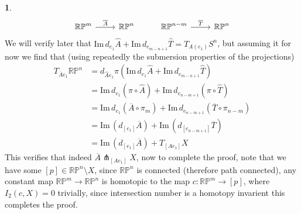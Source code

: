 \documentclass[10.5pt]{article}
\theoremstyle{definition}
\newtheorem{pb}{}
\begin{document}
\begin{pb}
\begin{equation*}
\begin{tikzcd}
            \mathbb{RP}^m \arrow[r,"{\overline{A}}"] &\mathbb{RP}^n &\mathbb{RP}^{n-m} \arrow[r,"\overline{T}"] &\mathbb{RP}^n
            \end{tikzcd}
        \end{equation*}
        We will verify later that \(\text{Im}\,d_{e_1}\widehat{A} + \text{Im}\,d_{e_{m-n+1}}\widehat{T} = T_{A(e_1)}S^n\), but assuming it for now we find that (using repeatedly the submersion properties of the projections)
        \begin{align*}
            T_{\overline{A}e_1}\mathbb{RP}^n &= d_{\widehat{A}e_1}\pi(\text{Im}\,d_{e_1}\widehat{A} + \text{Im}\,d_{e_{m-n+1}}\widehat{T}) \\
            &= \text{Im}\,d_{e_1}(\pi\circ\widehat{A}) + \text{Im}\,d_{e_{n-m+1}}(\pi\circ\widehat{T}) \\
            &= \text{Im}\,d_{e_1}(\overline{A}\circ\pi_m) + \text{Im}\,d_{e_{n-m+1}}(\overline{T}\circ\pi_{n-m}) \\
            &= \text{Im}\,(d_{[e_1]}\overline{A}) + \text{Im}\,(d_{[e_{n-m+1}]}\overline{T}) \\
            &= \text{Im}\,(d_{[e_1]}\overline{A}) + T_{[Ae_1]}X
        \end{align*}
        This verifies that indeed \(\overline{A}\pitchfork_{[Ae_1]}X\), now to complete the proof, note that we have some \([p] \in \mathbb{RP}^n \setminus X\), since \(\mathbb{RP}^n\) is connected (therefore path connected), any constant map \(\mathbb{RP}^m \to \mathbb{RP}^n\) is homotopic to the map \(c:\mathbb{RP}^m \to [p]\), where \(I_2(c,X) = 0\) trivially, since intersection number is a homotopy invarient this completes the proof.


\end{pb}
\end{document}
